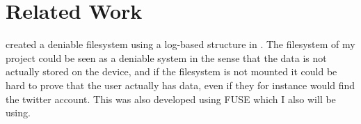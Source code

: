 \section{Related Work}
\citeauthor{peters_defy_2014} created a deniable filesystem using a log-based structure in \citeyear{peters_defy_2014}\cite{peters_defy_2014}. The filesystem of my project could be seen as a deniable system in the sense that the data is not actually stored on the device, and if the filesystem is not mounted it could be hard to prove that the user actually has data, even if they for instance would find the twitter account. This was also developed using FUSE\cite{noauthor_libfuse_2021} which I also will be using.